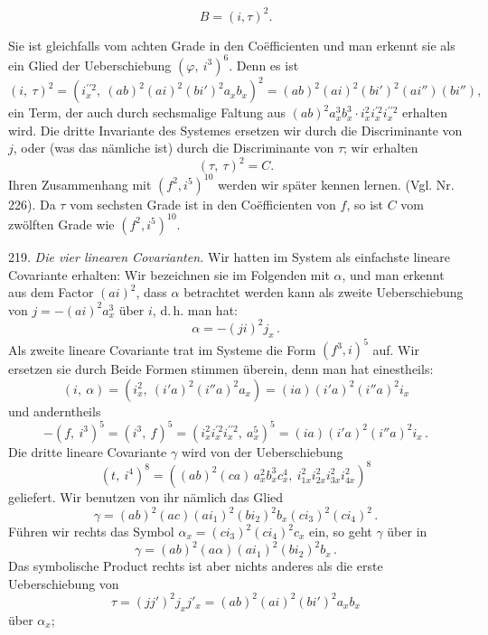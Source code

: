 \[ B = (i, \tau)^2. \]


Sie ist gleichfalls vom achten Grade in den Co\"efficienten und man erkennt sie als ein Glied der Ueberschiebung $(\varphi,\ i^3)^6$. Denn es ist
\[
(i,\ \tau)^2 = (i_x^{\prime\prime 2},\ (ab)^2(ai)^2(bi')^2 a_x b_x)^2 = (ab)^2(ai)^2(bi')^2(ai'')(bi''),
\]
ein Term, der auch durch sechsmalige Faltung aus $(ab)^2 a_x^3 b_x^3 \cdot i_x^2 i_x^{\prime 2} i_x^{\prime\prime 2}$ erhalten wird. Die dritte Invariante des Systemes ersetzen wir durch die Discriminante von $j$, oder (was das n\"amliche ist) durch die Discriminante von $\tau$; wir erhalten
\[
(\tau,\ \tau)^2 = C.
\]
Ihren Zusammenhang mit $(f^2, i^5)^{10}$ werden wir sp\"ater kennen lernen. (Vgl. Nr. 226). Da $\tau$ vom sechsten Grade ist in den Co\"efficienten von $f$, so ist $C$ vom zw\"olften Grade wie $(f^2, i^5)^{10}$.

219. \textit{Die vier linearen Covarianten.} Wir hatten im System als einfachste lineare Covariante erhalten:
Wir bezeichnen sie im Folgenden mit $\alpha$, und man erkennt aus dem Factor $(ai)^2$, dass $\alpha$ betrachtet werden kann als zweite Ueberschiebung von $j = -(ai)^2 a_x^3$ \"uber $i$, d.\,h. man hat:
\[
\alpha = -(ji)^2 j_x\,.
\]
Als zweite lineare Covariante trat im Systeme die Form $(f^3, i)^5$ auf. Wir ersetzen sie durch
Beide Formen stimmen \"uberein, denn man hat einestheils:
\[
(i,\ \alpha) = (i_x^2,\ (i'a)^2(i''a)^2 a_x) = (ia)(i'a)^2(i''a)^2 i_x
\]
und anderntheils
\[
-(f,\ i^3)^5 = (i^3,\ f)^5 = (i_x^2 i_x^{\prime 2} i_x^{\prime\prime 2},\ a_x^5)^5 = (ia)(i'a)^2(i''a)^2 i_x\,.
\]
Die dritte lineare Covariante $\gamma$ wird von der Ueberschiebung
\[
(t,\ i^4)^8 = ((ab)^2(ca)\,a_x^2 b_x^3 c_x^4,\ i_{1x}^2 i_{2x}^2 i_{3x}^2 i_{4x}^2)^8
\]
geliefert. Wir benutzen von ihr n\"amlich das Glied
\[
\gamma = (ab)^2(ac)(ai_1)^2(bi_2)^2 b_x (ci_3)^2(ci_4)^2\,.
\]
F\"uhren wir rechts das Symbol $\alpha_x = (ci_3)^2(ci_4)^2 c_x$ ein, so geht $\gamma$ \"uber in
\[
\gamma = (ab)^2(a\alpha)(ai_1)^2(bi_2)^2 b_x\,.
\]
Das symbolische Product rechts ist aber nichts anderes als die erste Ueberschiebung von
\[
\tau = (jj')^2 j_x j'_x = (ab)^2(ai)^2(bi')^2 a_x b_x
\]
\"uber $\alpha_x$;


